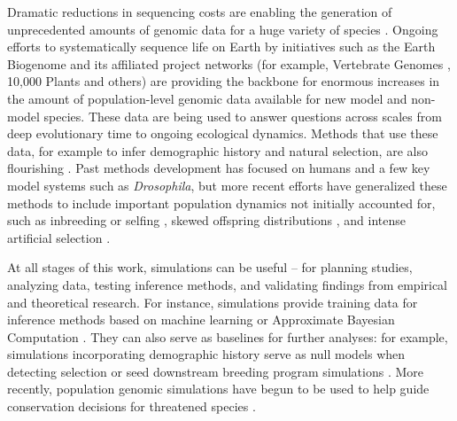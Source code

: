 \documentclass[hidelinks]{article}
\begin{document}

Dramatic reductions in sequencing costs are enabling the generation of
unprecedented amounts of genomic data for a huge variety of species
\citep{Ellegren2014}. Ongoing efforts to systematically sequence life on
Earth by initiatives such as the Earth Biogenome \citep{Lewin2022} and its
affiliated project networks (for example, Vertebrate Genomes
\citep{Rhie2021}, 10,000 Plants \citep{Cheng2018} and others) are
providing the backbone for enormous increases in the amount of population-level genomic data
available for new model and non-model species.
These data are being used to answer questions across scales
from deep evolutionary time to ongoing ecological dynamics.
Methods that use these data, for example to infer demographic history and natural selection,
are also flourishing \citep{Beichman2018}.
Past methods development has focused on humans and a few key model systems such as \emph{Drosophila},
but more recent efforts have
generalized these methods to include important population dynamics not initially accounted for,
such as inbreeding or selfing \citep{Blischak2020}, skewed offspring
distributions \citep{Montano2016}, and intense artificial selection \citep{MacLeod2013, MacLeod2014}.

At all stages of this work, simulations can be useful --
for planning studies, analyzing data, testing inference methods,
and validating findings from empirical and theoretical research.
For instance, simulations provide training data
for inference methods based on machine learning \citep{Schrider2018} or
Approximate Bayesian Computation \citep{Csillery2010}. They can also serve as
baselines for further analyses: for example, simulations incorporating
demographic history serve as null models when detecting selection \citep{Hsieh2016a}
or seed downstream breeding program simulations \citep{Gaynor2020}.
More recently, population genomic simulations have begun
to be used to help guide conservation decisions for threatened species
\citep{Teixeira2021,kyriazis2022using}.
\end{document}
